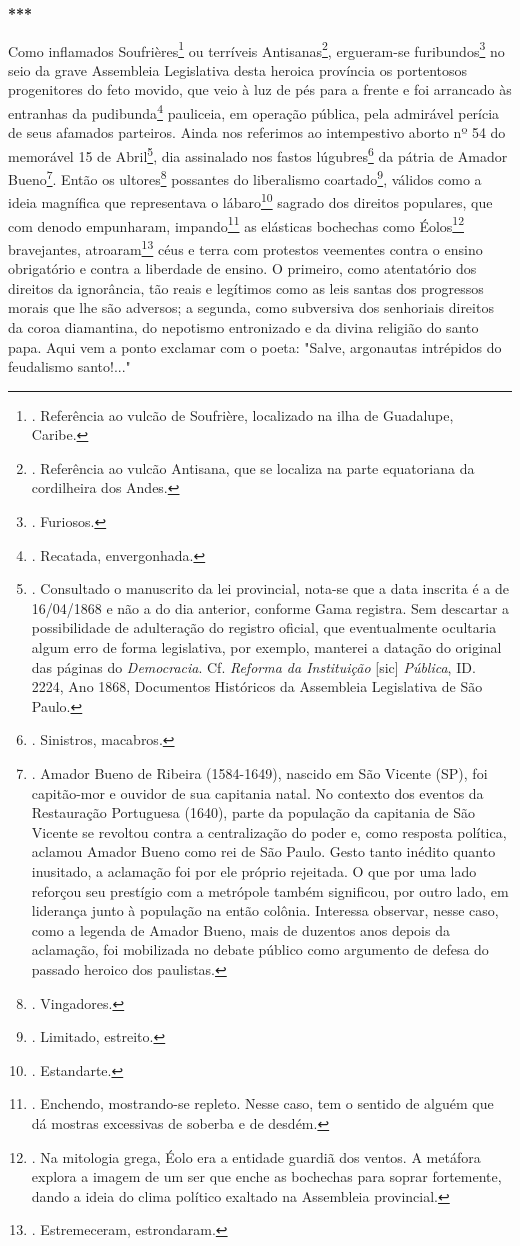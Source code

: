 \textbf{***}

Como inflamados Soufrières\footnote{. Referência ao vulcão de Soufrière,
  localizado na ilha de Guadalupe, Caribe.} ou terríveis
Antisanas\footnote{. Referência ao vulcão Antisana, que se localiza na
  parte equatoriana da cordilheira dos Andes.}, ergueram-se
furibundos\footnote{. Furiosos.} no seio da grave Assembleia Legislativa
desta heroica província os portentosos progenitores do feto movido, que
veio à luz de pés para a frente e foi arrancado às entranhas da
pudibunda\footnote{. Recatada, envergonhada.} pauliceia, em operação
pública, pela admirável perícia de seus afamados parteiros. Ainda nos
referimos ao intempestivo aborto nº 54 do memorável 15 de
Abril\footnote{. Consultado o manuscrito da lei provincial, nota-se que
  a data inscrita é a de 16/04/1868 e não a do dia anterior, conforme
  Gama registra. Sem descartar a possibilidade de adulteração do
  registro oficial, que eventualmente ocultaria algum erro de forma
  legislativa, por exemplo, manterei a datação do original das páginas
  do \emph{Democracia}. Cf. \emph{Reforma da Instituição} {[}sic{]}
  \emph{Pública}, ID. 2224, Ano 1868, Documentos Históricos da
  Assembleia Legislativa de São Paulo.}, dia assinalado nos fastos
lúgubres\footnote{. Sinistros, macabros.} da pátria de Amador
Bueno\footnote{. Amador Bueno de Ribeira (1584-1649), nascido em São
  Vicente (SP), foi capitão-mor e ouvidor de sua capitania natal. No
  contexto dos eventos da Restauração Portuguesa (1640), parte da
  população da capitania de São Vicente se revoltou contra a
  centralização do poder e, como resposta política, aclamou Amador Bueno
  como rei de São Paulo. Gesto tanto inédito quanto inusitado, a
  aclamação foi por ele próprio rejeitada. O que por uma lado reforçou
  seu prestígio com a metrópole também significou, por outro lado, em
  liderança junto à população na então colônia. Interessa observar,
  nesse caso, como a legenda de Amador Bueno, mais de duzentos anos
  depois da aclamação, foi mobilizada no debate público como argumento
  de defesa do passado heroico dos paulistas.}. Então os
ultores\footnote{. Vingadores.} possantes do liberalismo
coartado\footnote{. Limitado, estreito.}, válidos como a ideia magnífica
que representava o lábaro\footnote{. Estandarte.} sagrado dos direitos
populares, que com denodo empunharam, impando\footnote{. Enchendo,
  mostrando-se repleto. Nesse caso, tem o sentido de alguém que dá
  mostras excessivas de soberba e de desdém.} as elásticas bochechas
como Éolos\footnote{. Na mitologia grega, Éolo era a entidade guardiã
  dos ventos. A metáfora explora a imagem de um ser que enche as
  bochechas para soprar fortemente, dando a ideia do clima político
  exaltado na Assembleia provincial.} bravejantes, atroaram\footnote{.
  Estremeceram, estrondaram.} céus e terra com protestos veementes
contra o ensino obrigatório e contra a liberdade de ensino. O primeiro,
como atentatório dos direitos da ignorância, tão reais e legítimos como
as leis santas dos progressos morais que lhe são adversos; a segunda,
como subversiva dos senhoriais direitos da coroa diamantina, do
nepotismo entronizado e da divina religião do santo papa. Aqui vem a
ponto exclamar com o poeta: "Salve, argonautas intrépidos do feudalismo
santo!..."

